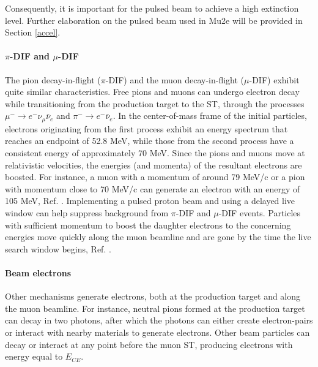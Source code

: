 Consequently, 
it is important for the pulsed beam to achieve a high extinction level. Further elaboration 
on the pulsed beam used in Mu2e will be provided in Section \ref{accel}.
\paragraph{$\pi$-DIF and $\mu$-DIF}
The pion decay-in-flight ($\pi$-DIF) and the muon decay-in-flight ($\mu$-DIF) 
exhibit quite similar characteristics. Free pions and muons can 
undergo electron decay while transitioning from the 
production target to the ST, through the processes 
$\mu^- \rightarrow e^- \nu_\mu \bar{\nu}_e$ and 
$\pi^- \rightarrow e^- \bar{\nu}_e$. In the center-of-mass 
frame of the initial particles, electrons originating 
from the first process exhibit an energy spectrum that 
reaches an endpoint of 52.8 MeV, while those from the 
second process have a consistent energy of approximately 
70 MeV. Since the pions and muons move at relativistic velocities, 
the energies (and momenta) of the resultant electrons are 
boosted. For instance, a muon with a momentum of around 
79 MeV/c or a pion with momentum close to 70 MeV/c can generate 
an electron with an energy of 105 MeV, Ref. \cite{bartoszek2015mu2e}. 
Implementing a pulsed proton beam and using a delayed 
live window can help suppress background from $\pi$-DIF and 
$\mu$-DIF events. Particles with sufficient momentum 
to boost the daughter electrons to the concerning energies 
move quickly along the muon beamline and are gone by the 
time the live search window begins, Ref. \cite{bobbb}. 

\paragraph{Beam electrons}\label{beamelectrons}
Other mechanisms generate electrons, both at the production target 
and along the muon beamline. For instance, neutral pions formed at 
the production target can decay in two photons, after which the 
photons can either create electron-pairs or interact with nearby 
materials to generate electrons. {\red Other beam particles can decay or 
interact at any point before the muon ST, producing electrons 
with energy equal to $E_{CE}$.}

